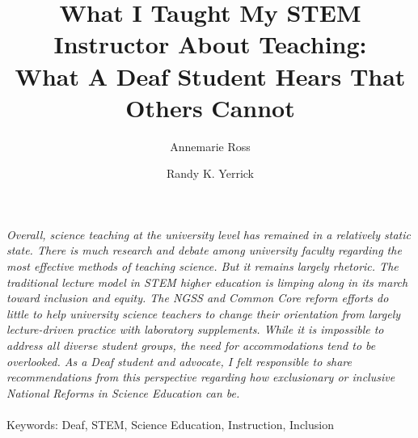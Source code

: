 \documentclass[11.5pt]{sig-alternate} %
\makeatletter
\let\oldabstract\abstract
\let\oldendabstract\endabstract
\renewenvironment{abstract} %
{\renewenvironment{quotation}%
               {\list{}{\addtolength{\leftmargin}{1em} %
                        \listparindent 1.5em%
                        \itemindent    \listparindent%
                        \rightmargin   \leftmargin%
                        \parsep        \z@ \@plus\p@}%
                \item\relax}%
               {\endlist}%
\oldabstract}
{\oldendabstract}
\makeatother
\begin{document}
\title{What I Taught My STEM Instructor About Teaching: \\ What A Deaf Student Hears That Others Cannot}

\author[1]{\large \color{blue}Annemarie Ross}
\author[2]{\large \color{blue}Randy K. Yerrick}


\toappear{}
\maketitle
\begin{@twocolumnfalse} 
\begin{abstract}
\item 
\textit{Overall, science teaching at the university level has remained in a relatively static state. There is much research and debate among university faculty regarding the most effective methods of teaching science.  But it remains largely rhetoric.  The traditional lecture model in STEM higher education is limping along in its march toward inclusion and equity.  The NGSS and Common Core reform efforts do little to help university science teachers to change their orientation from largely lecture-driven practice with laboratory supplements. While it is impossible to address all diverse student groups, the need for accommodations tend to be overlooked.  As a Deaf student and advocate, I felt responsible to share recommendations from this perspective regarding how exclusionary or inclusive National Reforms in Science Education can be.}
\\ \\
Keywords: Deaf, STEM, Science Education, Instruction, Inclusion
\end{abstract}
\end{@twocolumnfalse}

\end{document}
